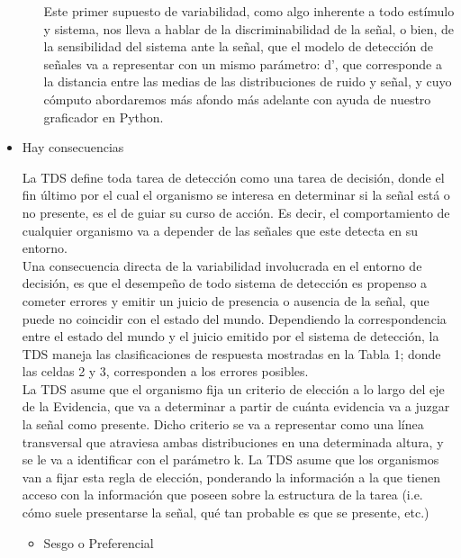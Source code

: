 \begin{itemize}
\begin{itemize}
Este primer supuesto de variabilidad, como algo inherente a todo estímulo y sistema, nos lleva a hablar de la discriminabilidad de la señal, o bien, de la sensibilidad del sistema ante la señal, que el modelo de detección de señales va a representar con un mismo parámetro: d’, que corresponde a la distancia entre las medias de las distribuciones de ruido y señal, y cuyo cómputo abordaremos más afondo más adelante con ayuda de nuestro graficador en Python.\\ 

     \end{itemize}
  \item{Hay consecuencias}

La TDS define toda tarea de detección como una tarea de decisión, donde el fin último por el cual el organismo se interesa en determinar si la señal está o no presente, es el de guiar su curso de acción. Es decir, el comportamiento de cualquier organismo va a depender de las señales que este detecta en su entorno.\\

Una consecuencia directa de la variabilidad involucrada en el entorno de decisión, es que el desempeño de todo sistema de detección es propenso a cometer errores y emitir un juicio de presencia o ausencia de la señal, que puede no coincidir con el estado del mundo. Dependiendo la correspondencia entre el estado del mundo y el juicio emitido por el sistema de detección, la TDS maneja las clasificaciones de respuesta mostradas en la Tabla 1; donde las celdas 2 y 3, corresponden a los errores posibles.\\

La TDS asume que el organismo fija un criterio de elección a lo largo del eje de la Evidencia, que va a determinar a partir de cuánta evidencia va a juzgar la señal como presente. Dicho criterio se va a representar como una línea transversal que atraviesa ambas distribuciones en una determinada altura, y se le va a identificar con el parámetro k. La TDS asume que los organismos van a fijar esta regla de elección, ponderando la información a la que tienen acceso con la información que poseen sobre la estructura de la tarea (i.e. cómo suele presentarse la señal, qué tan probable es que se presente, etc.)\\

    \begin{itemize}
      \item{Sesgo o Preferencial}\\


\end{itemize}
\end{itemize}
